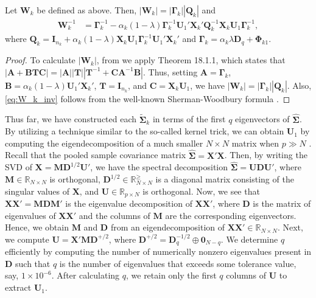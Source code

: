 \documentclass[11pt]{article}
\begin{document}
\begin{proposition}\label{proposition:rda-W_k}
Let $\bm W_k$ be defined as above. Then, $|\bm W_k| = |\bm \Gamma_k| |\bm Q_k|$ and
	\begin{align}
		\bm W_k^{-1} &= \bm \Gamma_k^{-1} - \alpha_k(1 - \lambda) \bm \Gamma_k^{-1} \bm U_1' \bm X_k' \bm Q_k^{-1} \bm X_k \bm U_1 \bm \Gamma_k^{-1},\label{eq:W_k_inv}
	\end{align}
where $\bm Q_k = \bm I_{n_k} + \alpha_k(1- \lambda) \bm X_k \bm U_1 \bm \Gamma_k^{-1} \bm U_1' \bm X_k'$ and $\bm \Gamma_k = \alpha_k \lambda \bm D_q + \bm \Phi_{k1}$.
\end{proposition}
\begin{proof}
	To calculate $|\bm W_k|$, from \cite{Harville:2008wja} we apply Theorem 18.1.1, which states that $|\bm A + \bm B \bm T \bm C| = |\bm A| |\bm T| |\bm T^{-1} + \bm C \bm A^{-1} \bm B|$. Thus, setting $\bm A = \bm \Gamma_k$, $\bm B = \alpha_k (1 - \lambda) \bm U_1' \bm X_k'$, $\bm T = \bm I_{n_k}$, and $\bm C = \bm X_k \bm U_1$, we have $|\bm W_k| = |\bm \Gamma_k| |\bm Q_k|$. Also,  \eqref{eq:W_k_inv} follows from the well-known Sherman-Woodbury formula \citep[Theorem 18.2.8]{Harville:2008wja}.
\end{proof}

Thus far, we have constructed each $\tilde{\bm \Sigma}_k$ in terms of the first $q$ eigenvectors of $\widehat{\bm \Sigma}$. By utilizing a technique similar to the so-called kernel trick, we can obtain $\bm U_1$ by computing the eigendecomposition of a much smaller $N \times N$ matrix when $p \gg N$ \citep{Hastie:2008dt}. Recall that the pooled sample covariance matrix $\widehat{\bm\Sigma} = \bm X' \bm X$. Then, by writing the SVD of $\bm X = \bm M \bm D^{1/2} \bm U'$, we have the spectral decomposition $\widehat{\bm\Sigma} = \bm U \bm D \bm U'$, where $\bm M \in \mathbb{R}_{N \times N}$ is orthogonal, $\bm D^{1/2} \in \mathbb{R}_{N \times N}^{\ge}$ is a diagonal matrix consisting of the singular values of $\bm X$, and $\bm U \in \mathbb{R}_{p \times N}$ is orthogonal. Now, we see that $\bm X \bm X' = \bm M \bm D \bm M'$ is the eigenvalue decomposition of $\bm X \bm X'$, where $\bm D$ is the matrix of eigenvalues of $\bm X \bm X'$ and the columns of $\bm M$  are the corresponding eigenvectors. Hence, we obtain $\bm M$ and $\bm D$ from an eigendecomposition of $\bm X \bm X' \in \mathbb{R}_{N \times N}$. Next, we compute $\bm U = \bm X' \bm M \bm D^{+/2}$, where $\bm D^{+/2} = \bm D_q^{-1/2} \oplus \bm 0_{N-q}$. We determine $q$ efficiently by computing the number of numerically nonzero eigenvalues present in $\bm D$ such that $q$ is the number of eigenvalues that exceeds some tolerance value, say, $1 \times 10^{-6}$. After calculating $q$, we retain only the first $q$ columns of $\bm U$ to extract $\bm U_1$.
\end{document}
